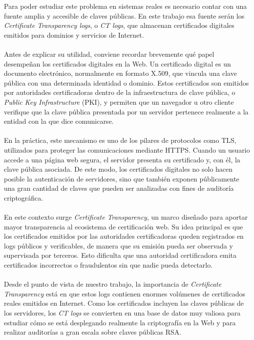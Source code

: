 Para poder estudiar este problema en sistemas reales es necesario contar con una fuente amplia y accesible de claves públicas. En este trabajo esa fuente serán los \textit{Certificate Transparency logs}, o \textit{CT logs}, que almacenan certificados digitales emitidos para dominios y servicios de Internet.
\\
\\
Antes de explicar su utilidad, conviene recordar brevemente qué papel desempeñan los certificados digitales en la Web. Un certificado digital es un documento electrónico, normalmente en formato X.509, que vincula una clave pública con una determinada identidad o dominio. Estos certificados son emitidos por autoridades certificadoras dentro de la infraestructura de clave pública, o \textit{Public Key Infrastructure} (PKI), y permiten que un navegador u otro cliente verifique que la clave pública presentada por un servidor pertenece realmente a la entidad con la que dice comunicarse.
\\
\\
En la práctica, este mecanismo es uno de los pilares de protocolos como TLS, utilizados para proteger las comunicaciones mediante HTTPS. Cuando un usuario accede a una página web segura, el servidor presenta su certificado y, con él, la clave pública asociada. De este modo, los certificados digitales no solo hacen posible la autenticación de servidores, sino que también exponen públicamente una gran cantidad de claves que pueden ser analizadas con fines de auditoría criptográfica.
\\
\\
En este contexto surge \textit{Certificate Transparency}, un marco diseñado para aportar mayor transparencia al ecosistema de certificación web. Su idea principal es que los certificados emitidos por las autoridades certificadoras queden registrados en logs públicos y verificables, de manera que su emisión pueda ser observada y supervisada por terceros. Esto dificulta que una autoridad certificadora emita certificados incorrectos o fraudulentos sin que nadie pueda detectarlo.
\\
\\
Desde el punto de vista de nuestro trabajo, la importancia de \textit{Certificate Transparency} está en que estos logs contienen enormes volúmenes de certificados reales emitidos en Internet. Como los certificados incluyen las claves públicas de los servidores, los \textit{CT logs} se convierten en una base de datos muy valiosa para estudiar cómo se está desplegando realmente la criptografía en la Web y para realizar auditorías a gran escala sobre claves públicas RSA.
